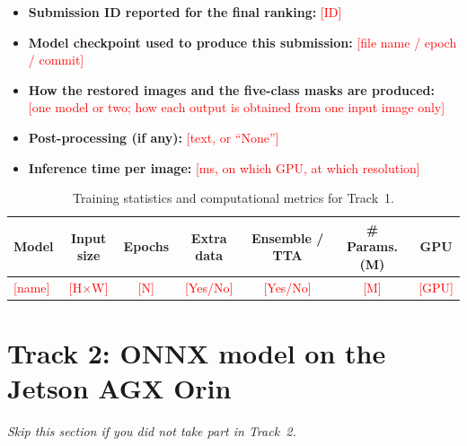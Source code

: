\documentclass{article}
\newcommand{\todo}[1]{\textcolor{red}{[#1]}}
\begin{document}
\begin{itemize}
\item \textbf{Submission ID reported for the final ranking:} \todo{ID}
\item \textbf{Model checkpoint used to produce this submission:} \todo{file name / epoch / commit}
\item \textbf{How the restored images and the five-class masks are produced:} \todo{one model or two; how each output is obtained from one input image only}
\item \textbf{Post-processing (if any):} \todo{text, or ``None''}
\item \textbf{Inference time per image:} \todo{ms, on which GPU, at which resolution}
\end{itemize}

\begin{table}[h]
    \centering
    \begin{tabular}{lcccccc}
        \toprule
        Model & Input size & Epochs & Extra data & Ensemble / TTA & \# Params. (M) & GPU \\
        \midrule
        \todo{name} & \todo{H$\times$W} & \todo{N} & \todo{Yes/No} & \todo{Yes/No} & \todo{M} & \todo{GPU} \\
        \bottomrule
    \end{tabular}
    \caption{Training statistics and computational metrics for Track~1.}
    \label{tab:t1}
\end{table}

\section{Track 2: ONNX model on the Jetson AGX Orin}\label{sec:t2}
\emph{Skip this section if you did not take part in Track~2.}
\end{document}
